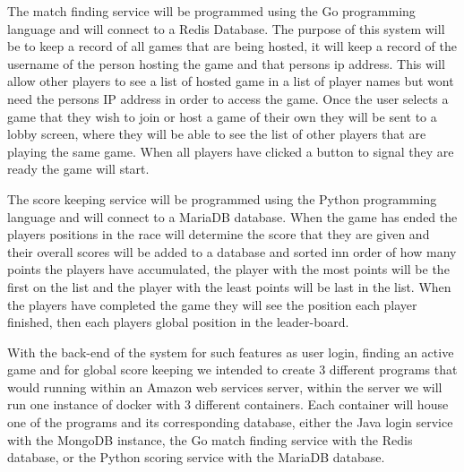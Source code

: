 The match finding service will be programmed using the Go programming language and will connect to a Redis Database. The purpose of this system will be to keep a record of all games that are being hosted, it will keep a record of the username of the person hosting the game and that persons ip address. This will allow other players to see a list of hosted game in a list of player names but wont need the persons IP address in order to access the game. Once the user selects a game that they wish to join or host a game of their own they will be sent to a lobby screen, where they will be able to see the list of other players that are playing the same game. When all players have clicked a button to signal they are ready the game will start.\newline 

The score keeping service will be programmed using the Python programming language and will connect to a MariaDB database. When the game has ended the players positions in the race will determine the score that they are given and their overall scores will be added to a database and sorted inn order of how many points the players have accumulated, the player with the most points will be the first on the list and the player with the least points will be last in the list. When the players have completed the game they will see the position each player finished, then each players global position in the leader-board.\newline

With the back-end of the system for such features as user login, finding an active game and for global score keeping we intended to create 3 different programs that would running within an Amazon web services server, within the server we will run one instance of docker with 3 different containers. Each container will house one of the programs and its corresponding database, either the Java login service with the MongoDB instance, the Go match finding service with the Redis database, or the Python scoring service with the MariaDB database. \newline \newline

